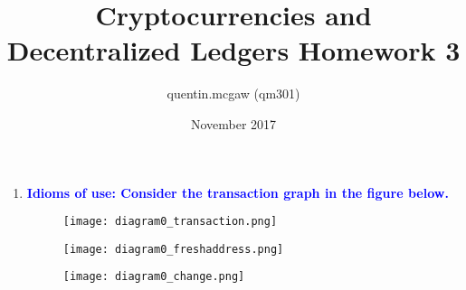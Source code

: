 \documentclass[11pt]{article}
\title{Cryptocurrencies and Decentralized Ledgers Homework 3}
\author{quentin.mcgaw (qm301)}
\date{November 2017}
\begin{document}
\maketitle

\begin{enumerate}

\item \textbf{\textcolor{blue}{Idioms of use: Consider the transaction graph in the figure below.}}
\begin{center}
\end{center}

\begin{figure}[h!]
\centering
\begin{minipage}{.3\textwidth}
  \centering
  \texttt{[image: diagram0\_transaction.png]}
\end{minipage}
\begin{minipage}{.3\textwidth}
  \centering
  \texttt{[image: diagram0\_freshaddress.png]}
\end{minipage}
\begin{minipage}{.3\textwidth}
  \centering
  \texttt{[image: diagram0\_change.png]}
\end{minipage}
\end{figure}


\end{enumerate}
\end{document}
